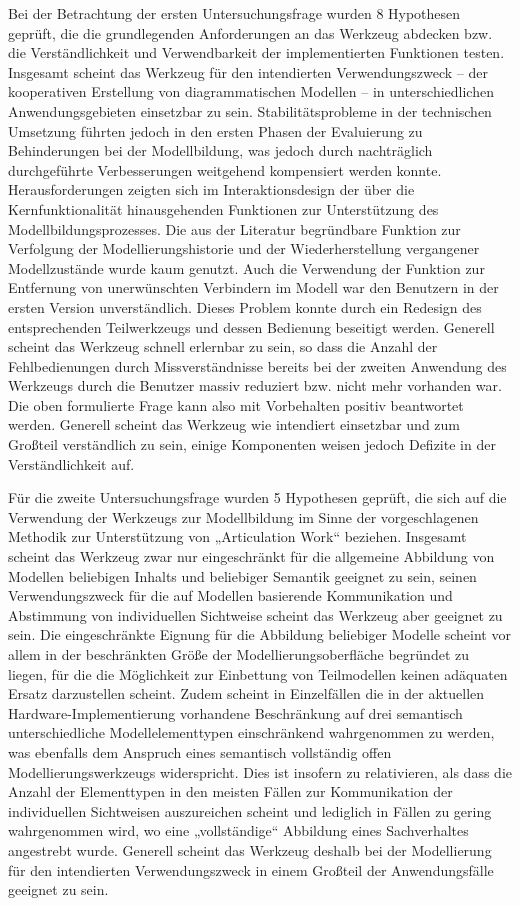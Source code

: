 Bei der Betrachtung der ersten Untersuchungsfrage wurden 8 Hypothesen geprüft, die die grundlegenden Anforderungen an das Werkzeug abdecken bzw. die Verständlichkeit und Verwendbarkeit der implementierten Funktionen testen. Insgesamt scheint das Werkzeug für den intendierten Verwendungszweck -- der kooperativen Erstellung von diagrammatischen Modellen -- in unterschiedlichen Anwendungsgebieten einsetzbar zu sein. Stabilitätsprobleme in der technischen Umsetzung führten jedoch in den ersten Phasen der Evaluierung zu Behinderungen bei der Modellbildung, was jedoch durch nachträglich durchgeführte Verbesserungen weitgehend kompensiert werden konnte. Herausforderungen zeigten sich im Interaktionsdesign der über die Kernfunktionalität hinausgehenden Funktionen zur Unterstützung des Modellbildungsprozesses. Die aus der Literatur begründbare Funktion zur Verfolgung der Modellierungshistorie und der Wiederherstellung vergangener Modellzustände wurde kaum genutzt. Auch die Verwendung der Funktion zur Entfernung von unerwünschten Verbindern im Modell war den Benutzern in der ersten Version unverständlich. Dieses Problem konnte durch ein Redesign des entsprechenden Teilwerkzeugs und dessen Bedienung beseitigt werden. Generell scheint das Werkzeug schnell erlernbar zu sein, so dass die Anzahl der Fehlbedienungen durch Missverständnisse bereits bei der zweiten Anwendung des Werkzeugs durch die Benutzer massiv reduziert bzw. nicht mehr vorhanden war. Die oben formulierte Frage kann also mit Vorbehalten positiv beantwortet werden. Generell scheint das Werkzeug wie intendiert einsetzbar und zum Großteil verständlich zu sein, einige Komponenten weisen jedoch Defizite in der Verständlichkeit auf.

Für die zweite Untersuchungsfrage wurden 5 Hypothesen geprüft, die sich auf die Verwendung der Werkzeugs zur Modellbildung im Sinne der vorgeschlagenen Methodik zur Unterstützung von „Articulation Work“ beziehen. Insgesamt scheint das Werkzeug zwar nur eingeschränkt für die allgemeine Abbildung von Modellen beliebigen Inhalts und beliebiger Semantik geeignet zu sein, seinen Verwendungszweck für die auf Modellen basierende Kommunikation und Abstimmung von individuellen Sichtweise scheint das Werkzeug aber geeignet zu sein. Die eingeschränkte Eignung für die Abbildung beliebiger Modelle scheint vor allem in der beschränkten Größe der Modellierungsoberfläche begründet zu liegen, für die die Möglichkeit zur Einbettung von Teilmodellen keinen adäquaten Ersatz darzustellen scheint. Zudem scheint in Einzelfällen die in der aktuellen Hardware-Implementierung vorhandene Beschränkung auf drei semantisch unterschiedliche Modellelementtypen einschränkend wahrgenommen zu werden, was ebenfalls dem Anspruch eines semantisch vollständig offen Modellierungswerkzeugs widerspricht. Dies ist insofern zu relativieren, als dass die Anzahl der Elementtypen in den meisten Fällen zur Kommunikation der individuellen Sichtweisen auszureichen scheint und lediglich in Fällen zu gering wahrgenommen wird, wo eine „vollständige“ Abbildung eines Sachverhaltes angestrebt wurde. Generell scheint das Werkzeug deshalb bei der Modellierung für den intendierten Verwendungszweck in einem Großteil der Anwendungsfälle geeignet zu sein.

